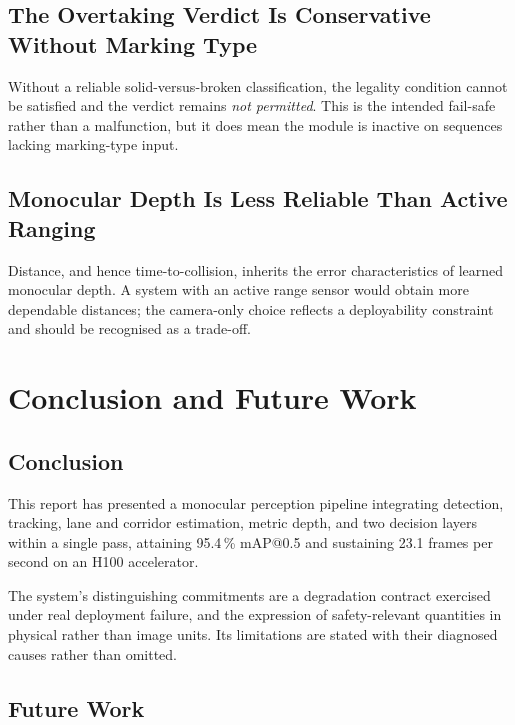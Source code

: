 \documentclass[11pt,a4paper]{report}
\begin{document}
\section{The Overtaking Verdict Is Conservative Without Marking Type}

Without a reliable solid-versus-broken classification, the legality condition
cannot be satisfied and the verdict remains \textit{not permitted}. This is the
intended fail-safe rather than a malfunction, but it does mean the module is
inactive on sequences lacking marking-type input.

\section{Monocular Depth Is Less Reliable Than Active Ranging}

Distance, and hence time-to-collision, inherits the error characteristics of
learned monocular depth. A system with an active range sensor would obtain more
dependable distances; the camera-only choice reflects a deployability constraint
and should be recognised as a trade-off.

\chapter{Conclusion and Future Work}

\section{Conclusion}

This report has presented a monocular perception pipeline integrating detection,
tracking, lane and corridor estimation, metric depth, and two decision layers
within a single pass, attaining 95.4\,\% mAP@0.5 and sustaining 23.1 frames per
second on an H100 accelerator.

The system's distinguishing commitments are a degradation contract exercised
under real deployment failure, and the expression of safety-relevant quantities
in physical rather than image units. Its limitations are stated with their
diagnosed causes rather than omitted.

\section{Future Work}
\end{document}
